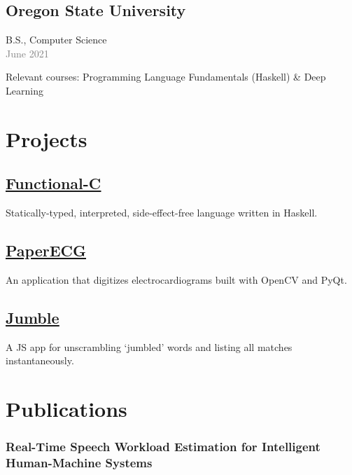 \documentclass[11pt]{article} %
\let\defaultref\href
\renewcommand{\href}[2]{%
  \defaultref{#1}{\ul{#2}}%
}
\renewcommand{\emph}[1]{%
  \textcolor{gray}{#1}%
}
\begin{document}
\begin{paracol}{2}
\begin{raggedright}
{\subsection{Oregon State University}\label{oregon-state-university}}

B.S., Computer Science\\
\emph{June 2021}

Relevant courses: Programming Language Fundamentals (Haskell) \& Deep
Learning

\hypertarget{projects}{%
\section{Projects}\label{projects}}

\hypertarget{functional-c}{%
\subsection{\texorpdfstring{\href{https://github.com/julianfortune/CS381Project}{Functional-C}}{Functional-C}}\label{functional-c}}

Statically-typed, interpreted, side-effect-free language written in
Haskell.

\hypertarget{paperecg}{%
\subsection{\texorpdfstring{\href{https://github.com/Tereshchenkolab/paper-ecg}{PaperECG}}{PaperECG}}\label{paperecg}}

An application that digitizes electrocardiograms built with OpenCV and
PyQt.

\hypertarget{jumble}{%
\subsection{\texorpdfstring{\href{https://julianfortune.com/unjumble/}{Jumble}}{Jumble}}\label{jumble}}

A JS app for unscrambling `jumbled' words and listing all matches
instantaneously.

\hypertarget{publications}{%
\section{Publications}\label{publications}}

\hypertarget{real-time-speech-workload-estimation-for-intelligent-human-machine-systems}{%
\subsubsection{Real-Time Speech Workload Estimation for Intelligent
Human-Machine
Systems}\label{real-time-speech-workload-estimation-for-intelligent-human-machine-systems}}


\end{raggedright}
\end{paracol}
\end{document}
